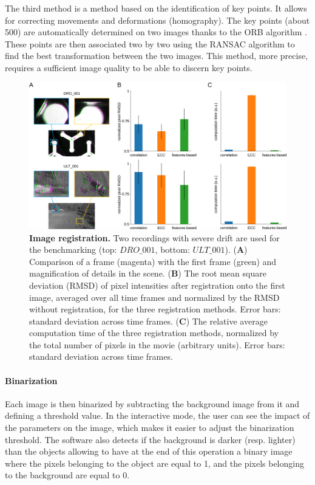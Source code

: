         The third method is a method based on the identification of key points. It allows for correcting movements and deformations (homography). The key points (about 500) are automatically determined on two images thanks to the ORB algorithm \cite{}. These points are then associated two by two using the RANSAC algorithm \cite{} to find the best transformation between the two images. This method, more precise, requires a sufficient image quality to be able to discern key points.

        \begin{figure}[h!]
        \centering
        \includegraphics[width=1\textwidth]{part_1/assets/Figure_2.png}
        \caption{{\bf Image registration.} Two recordings with severe drift are used for the benchmarking (top: $DRO\_001$, bottom: $ULT\_001$).
            (\textbf{A}) Comparison of a frame (magenta) with the first frame (green) and magnification of details in the scene.
            (\textbf{B}) The root mean square deviation (RMSD) of pixel intensities after registration onto the first image, averaged over all time frames and normalized by the RMSD without registration, for the three registration methods. Error bars: standard deviation across time frames.
            (\textbf{C}) The relative average computation time of the three registration methods, normalized by the total number of pixels in the movie (arbitrary units). Error bars: standard deviation across time frames.}
        \label{part_1:fig_2}
        \end{figure}

        \paragraph{Binarization}
        Each image is then binarized by subtracting the background image from it and defining a threshold value. In the interactive mode, the user can see the impact of the parameters on the image, which makes it easier to adjust the binarization threshold. The software also detects if the background is darker (resp. lighter) than the objects allowing to have at the end of this operation a binary image where the pixels belonging to the object are equal to 1, and the pixels belonging to the background are equal to 0.
